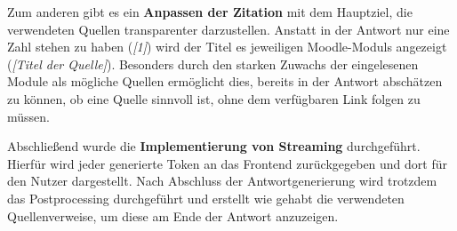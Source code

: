 Zum anderen gibt es ein \textbf{Anpassen der Zitation} mit dem Hauptziel, die verwendeten Quellen transparenter darzustellen. Anstatt in der Antwort nur eine Zahl stehen zu haben (\textit{[1]}) wird der Titel es jeweiligen Moodle-Moduls angezeigt (\textit{[Titel der Quelle]}). Besonders durch den starken Zuwachs der eingelesenen Module als mögliche Quellen ermöglicht dies, bereits in der Antwort abschätzen zu können, ob eine Quelle sinnvoll ist, ohne dem verfügbaren Link folgen zu müssen.

Abschließend wurde die \textbf{Implementierung von Streaming} durchgeführt. Hierfür wird jeder generierte Token an das Frontend zurückgegeben und dort für den Nutzer dargestellt. Nach Abschluss der Antwortgenerierung wird trotzdem das Postprocessing durchgeführt und erstellt wie gehabt die verwendeten Quellenverweise, um diese am Ende der Antwort anzuzeigen.
